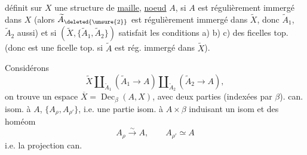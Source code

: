
définit sur $X$ une structure de  \uline{maille},  \uline{noeud} $A$, si   $A$ est régulièrement immergé dans $X$ (alors $\widetilde A_{\deleted{\unsure{2}}}$ est régulièrement immergé dans $\widetilde X$, donc $\widetilde A_1$, $\widetilde A_2$ aussi) et si $(\widetilde X,\{\widetilde A_1,\widetilde A_2\})$ satisfait les conditions a) b) c) des ficelles top. (donc est une ficelle top. si $\widetilde A$ est rég. immergé dans $\widetilde X$).

Considérons
\[
\widetilde X\amalg_{\widetilde A_1}(\widetilde A_1\longrightarrow A)
\amalg_{\widetilde A_2}(\widetilde A_2\longrightarrow A),
\]
on trouve un espace $\overline X=\operatorname{Dec}_{\beta}(A,X)$, avec deux parties (indexées par $\beta$). can. isom. à $A$, $\{A_\rho,A_{\rho'}\}$,  i.e. une partie isom. à $A\times\beta$
induisant un isom
et des homéom
\[
A_\rho\overset{\sim}{\longrightarrow} A,\qquad A_{\rho'}\simeq A
\]
i.e. la projection can.

